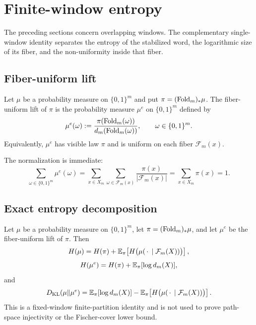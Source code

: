 \section{Finite-window entropy}\label{sec:entropy-ledger}

The preceding sections concern overlapping windows. The complementary single-window identity separates the entropy of the stabilized word, the logarithmic size of its fiber, and the non-uniformity inside that fiber.

\subsection{Fiber-uniform lift}\label{sec:entropy-ledger:lifts}

\begin{definition}\label{def:fiber-lift}
Let $\mu$ be a probability measure on $\{0,1\}^m$ and put
$\pi=(\mathrm{Fold}_m)_*\mu$.  The fiber-uniform lift of $\pi$ is the probability
measure $\mu^e$ on $\{0,1\}^m$ defined by
\[
  \mu^e(\omega)
  :=
  \frac{\pi(\mathrm{Fold}_m(\omega))}{d_m(\mathrm{Fold}_m(\omega))},
  \qquad \omega\in\{0,1\}^m .
\]
Equivalently, $\mu^e$ has visible law $\pi$ and is uniform on each fiber
$\mathcal F_m(x)$.
\end{definition}

\begin{remark}
The normalization is immediate:
\[
\sum_{\omega\in\{0,1\}^m}\mu^e(\omega)
=
\sum_{x\in X_m}\sum_{\omega\in\mathcal{F}_m(x)}\frac{\pi(x)}{|\mathcal{F}_m(x)|}
=
\sum_{x\in X_m}\pi(x)=1.
\]
\end{remark}

\subsection{Exact entropy decomposition}\label{sec:entropy-ledger:identity}

\begin{theorem}\label{thm:kl-ledger}
Let $\mu$ be a probability measure on $\{0,1\}^m$, let
$\pi=(\mathrm{Fold}_m)_*\mu$, and let $\mu^e$ be the fiber-uniform lift of $\pi$.
Then
\[
H(\mu)
=
H(\pi)+\mathbb{E}_\pi\!\left[
H\bigl(\mu(\,\cdot\,\mid\mathcal F_m(X))\bigr)
\right],
\]
\[
H(\mu^e)=H(\pi)+\mathbb{E}_\pi[\log d_m(X)],
\]
and
\[
D_{\mathrm{KL}}(\mu\|\mu^e)
=
\mathbb{E}_\pi[\log d_m(X)]
-
\mathbb{E}_\pi\!\left[
H\bigl(\mu(\,\cdot\,\mid\mathcal F_m(X))\bigr)
\right].
\]
This is a fixed-window finite-partition identity and is not used to prove
path-space injectivity or the Fischer-cover lower bound.
\end{theorem}

